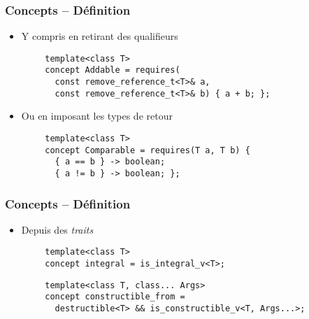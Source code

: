 \documentclass[C++.tex]{subfiles}
\begin{document}
\begin{frame}[fragile]
	\frametitle{Concepts -- Définition}
	\begin{itemize}
		\item Y compris en retirant des qualifieurs
	\end{itemize}

	\begin{verbatim}
		template<class T>
		concept Addable = requires(
		  const remove_reference_t<T>& a,
		  const remove_reference_t<T>& b) { a + b; };
  	\end{verbatim}

	\begin{itemize}
		\item Ou en imposant les types de retour
	\end{itemize}

	\begin{verbatim}
		template<class T>
		concept Comparable = requires(T a, T b) {
		  { a == b } -> boolean;
		  { a != b } -> boolean; };
	\end{verbatim}
\end{frame}

\begin{frame}[fragile]
	\frametitle{Concepts -- Définition}
	\begin{itemize}
		\item Depuis des \textit{traits}
	\end{itemize}

	\begin{verbatim}
		template<class T>
		concept integral = is_integral_v<T>;
	\end{verbatim}

	\begin{verbatim}
		template<class T, class... Args>
		concept constructible_from = 
		  destructible<T> && is_constructible_v<T, Args...>;
  	\end{verbatim}
\end{frame}
\end{document}
